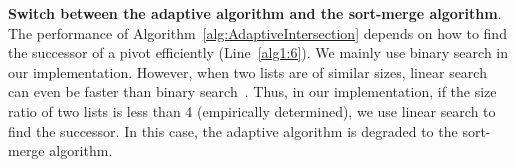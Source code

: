 %

\textbf{Switch between the adaptive algorithm and the sort-merge algorithm}. The performance of Algorithm~\ref{alg:AdaptiveIntersection} depends on how to find the successor of a pivot efficiently (Line~\ref{alg1:6}). We mainly use binary search in our implementation. However, when two lists are of similar sizes, linear search can even be faster than binary search~\cite{Ding2011}. Thus, in our implementation, if the size ratio of two lists is less than 4 (empirically determined), we use linear search to find the successor. In this case, the adaptive algorithm is degraded to the sort-merge algorithm.

